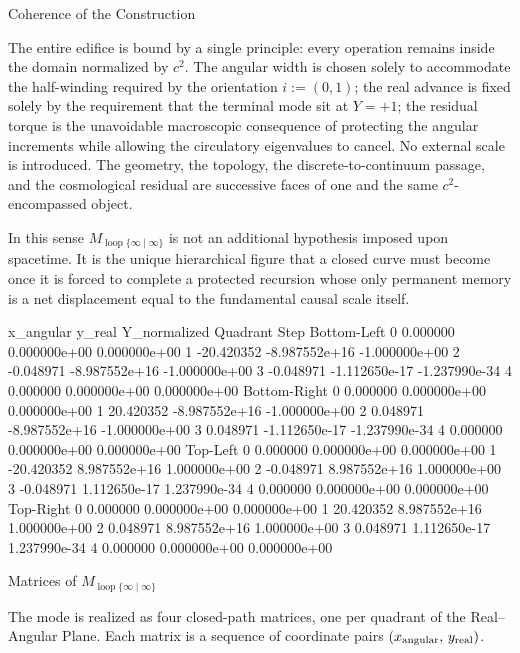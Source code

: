 Coherence of the Construction

The entire edifice is bound by a single principle: every operation remains inside the domain normalized by \(c^2\). The angular width is chosen solely to accommodate the half-winding required by the orientation \(i:=(0,1)\); the real advance is fixed solely by the requirement that the terminal mode sit at \(Y=+1\); the residual torque is the unavoidable macroscopic consequence of protecting the angular increments while allowing the circulatory eigenvalues to cancel. No external scale is introduced. The geometry, the topology, the discrete-to-continuum passage, and the cosmological residual are successive faces of one and the same \(c^2\)-encompassed object.

In this sense \(M_{\operatorname{loop}\{\infty\mid\infty\}}\) is not an additional hypothesis imposed upon spacetime. It is the unique hierarchical figure that a closed curve must become once it is forced to complete a protected recursion whose only permanent memory is a net displacement equal to the fundamental causal scale itself.

                   x_angular        y_real  Y_normalized
Quadrant     Step                                       
Bottom-Left  0      0.000000  0.000000e+00  0.000000e+00
             1    -20.420352 -8.987552e+16 -1.000000e+00
             2     -0.048971 -8.987552e+16 -1.000000e+00
             3     -0.048971 -1.112650e-17 -1.237990e-34
             4      0.000000  0.000000e+00  0.000000e+00
Bottom-Right 0      0.000000  0.000000e+00  0.000000e+00
             1     20.420352 -8.987552e+16 -1.000000e+00
             2      0.048971 -8.987552e+16 -1.000000e+00
             3      0.048971 -1.112650e-17 -1.237990e-34
             4      0.000000  0.000000e+00  0.000000e+00
Top-Left     0      0.000000  0.000000e+00  0.000000e+00
             1    -20.420352  8.987552e+16  1.000000e+00
             2     -0.048971  8.987552e+16  1.000000e+00
             3     -0.048971  1.112650e-17  1.237990e-34
             4      0.000000  0.000000e+00  0.000000e+00
Top-Right    0      0.000000  0.000000e+00  0.000000e+00
             1     20.420352  8.987552e+16  1.000000e+00
             2      0.048971  8.987552e+16  1.000000e+00
             3      0.048971  1.112650e-17  1.237990e-34
             4      0.000000  0.000000e+00  0.000000e+00

Matrices of \(M_{\operatorname{loop}\{\infty\mid\infty\}}\)

The mode is realized as four closed-path matrices, one per quadrant of the Real–Angular Plane.  
Each matrix is a sequence of coordinate pairs \((x_{\rm angular},\, y_{\rm real})\).

